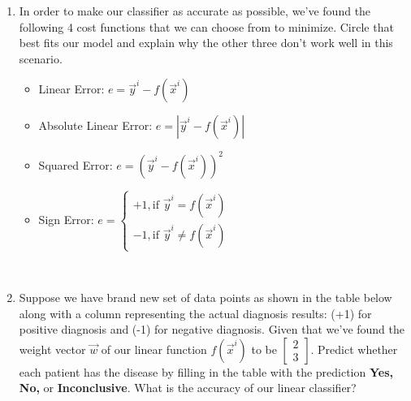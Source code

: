 \begin{enumerate}
    \item In order to make our classifier as accurate as possible, we've found the following 4 cost functions that we can choose from to minimize. Circle  that best fits our model and explain why the other three don't work well in this scenario.
    \begin{itemize}
        \item Linear Error: $e = \vec{y}^i - f(\vec{x}^i)$
        \item Absolute Linear Error: $e = |\vec{y}^i - f(\vec{x}^i)|$
        \item Squared Error: $e = (\vec{y}^i - f(\vec{x}^i))^2$
        \item Sign Error: $e = \left\{\begin{matrix}
        +1, \text{if } \vec{y}^i = f(\vec{x}^i) \\
        -1, \text{if } \vec{y}^i \neq f(\vec{x}^i)
        \end{matrix}\right.$
    \end{itemize}
     \\
        \item Suppose we have brand new set of data points as shown in the table below along with a column representing the actual diagnosis results: (+1) for positive diagnosis and (-1) for negative diagnosis. Given that we've found the weight vector $\vec{w}$ of our linear function $f(\vec{x}^i)$ to be $\begin{bmatrix}
            2\\ 
            3
            \end{bmatrix}$. Predict whether each patient has the disease by filling in the table with the prediction \textbf{Yes, No, } or \textbf{Inconclusive}. What is the accuracy of our linear classifier?

\end{enumerate}

